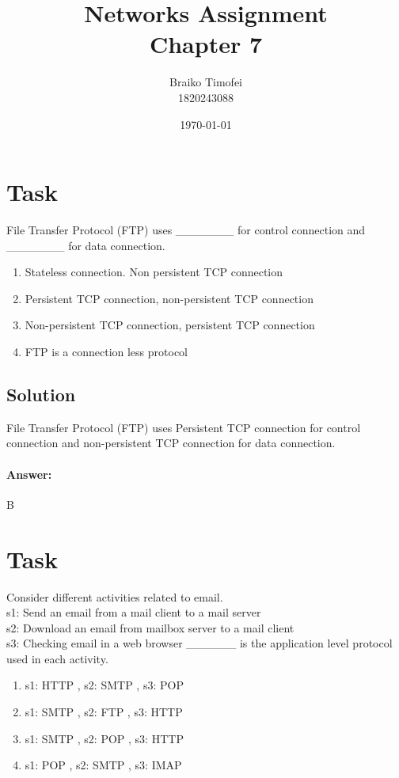 \documentclass[11pt]{article}
\title{Networks Assignment\\ Chapter 7}
\author{Braiko Timofei\\1820243088}
\date{\today}
\begin{document}
    \section{Task}\label{sec:task_1}
    File Transfer Protocol (FTP) uses \_\_\_\_\_\_\_ for control connection and \_\_\_\_\_\_\_ for data connection.
    \begin{enumerate}[label=\Alph*.]
        \item Stateless connection. Non persistent TCP connection
        \item Persistent TCP connection, non-persistent TCP connection
        \item Non-persistent TCP connection, persistent TCP connection
        \item FTP is a connection less protocol
    \end{enumerate}

    \subsection{Solution}
    File Transfer Protocol (FTP) uses Persistent TCP connection for control connection and non-persistent TCP connection for data connection.

    \paragraph{Answer:} B
    \newpage


    \section{Task}\label{sec:task_2}
    Consider different activities related to email. \\
    s1: Send an email from a mail client to a mail server \\
    s2: Download an email from mailbox server to a mail client \\
    s3: Checking email in a web browser \_\_\_\_\_\_ is the application level protocol used in each activity. \\

    \begin{enumerate}[label=\textbf{\Alph*.}]
        \item s1: HTTP , s2: SMTP , s3: POP
        \item s1: SMTP , s2: FTP , s3: HTTP
        \item s1: SMTP , s2: POP , s3: HTTP
        \item s1: POP , s2: SMTP , s3: IMAP
    \end{enumerate}
\end{document}
